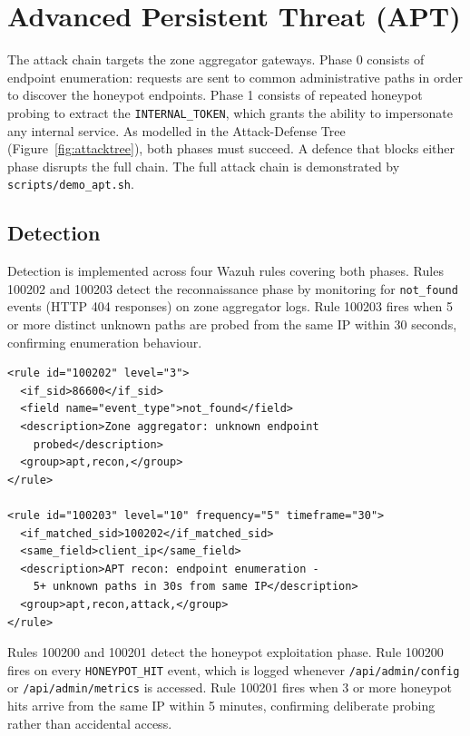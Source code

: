 \section{Advanced Persistent Threat (APT)}
\label{sec:threat-apt}

The attack chain targets the zone aggregator gateways. Phase 0 consists of endpoint enumeration: requests are sent to common
administrative paths in order to discover the honeypot endpoints. Phase 1
consists of repeated honeypot probing to extract the \texttt{INTERNAL\_TOKEN},
which grants the ability to impersonate any internal service. As modelled in the
Attack-Defense Tree (Figure~\ref{fig:attacktree}), both phases must succeed. A
defence that blocks either phase disrupts the full chain. The full attack chain
is demonstrated by \texttt{scripts/demo\_apt.sh}.

\subsection{Detection}

Detection is implemented across four Wazuh rules covering both phases. Rules
100202 and 100203 detect the reconnaissance phase by monitoring for
\texttt{not\_found} events (HTTP 404 responses) on zone aggregator logs. Rule
100203 fires when 5 or more distinct unknown paths are probed from the same IP
within 30 seconds, confirming enumeration behaviour.

\begin{lstlisting}[style=xmlstyle, caption={Wazuh rules for APT recon detection.}]
<rule id="100202" level="3">
  <if_sid>86600</if_sid>
  <field name="event_type">not_found</field>
  <description>Zone aggregator: unknown endpoint
    probed</description>
  <group>apt,recon,</group>
</rule>

<rule id="100203" level="10" frequency="5" timeframe="30">
  <if_matched_sid>100202</if_matched_sid>
  <same_field>client_ip</same_field>
  <description>APT recon: endpoint enumeration -
    5+ unknown paths in 30s from same IP</description>
  <group>apt,recon,attack,</group>
</rule>
\end{lstlisting}

Rules 100200 and 100201 detect the honeypot exploitation phase. Rule 100200
fires on every \texttt{HONEYPOT\_HIT} event, which is logged whenever
\texttt{/api/admin/config} or \texttt{/api/admin/metrics} is accessed.
Rule 100201 fires when 3 or more honeypot hits arrive from the same IP within
5 minutes, confirming deliberate probing rather than accidental access.

